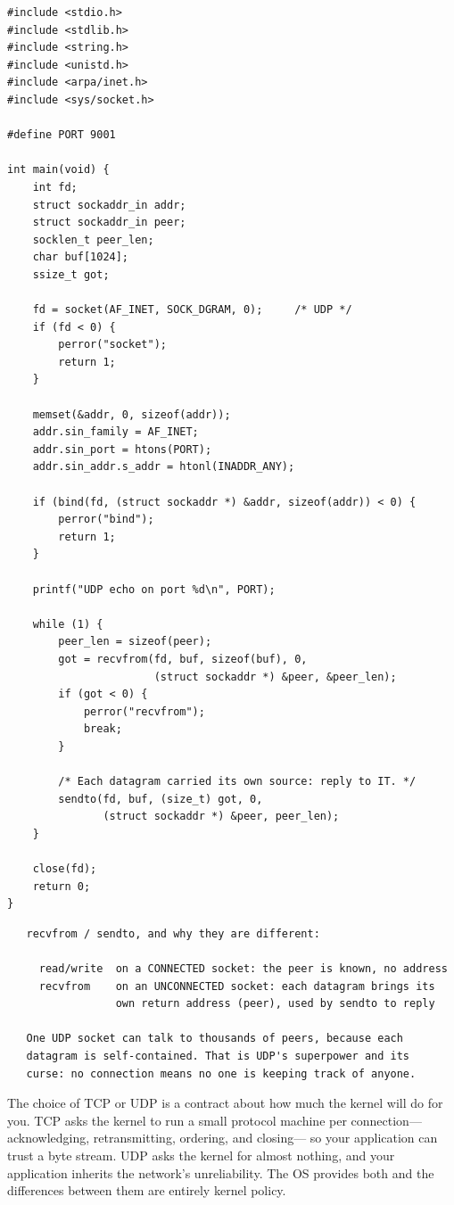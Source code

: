 \begin{lstlisting}[caption={udp\_echo.c: a datagram echo server.}]
#include <stdio.h>
#include <stdlib.h>
#include <string.h>
#include <unistd.h>
#include <arpa/inet.h>
#include <sys/socket.h>

#define PORT 9001

int main(void) {
    int fd;
    struct sockaddr_in addr;
    struct sockaddr_in peer;
    socklen_t peer_len;
    char buf[1024];
    ssize_t got;

    fd = socket(AF_INET, SOCK_DGRAM, 0);     /* UDP */
    if (fd < 0) {
        perror("socket");
        return 1;
    }

    memset(&addr, 0, sizeof(addr));
    addr.sin_family = AF_INET;
    addr.sin_port = htons(PORT);
    addr.sin_addr.s_addr = htonl(INADDR_ANY);

    if (bind(fd, (struct sockaddr *) &addr, sizeof(addr)) < 0) {
        perror("bind");
        return 1;
    }

    printf("UDP echo on port %d\n", PORT);

    while (1) {
        peer_len = sizeof(peer);
        got = recvfrom(fd, buf, sizeof(buf), 0,
                       (struct sockaddr *) &peer, &peer_len);
        if (got < 0) {
            perror("recvfrom");
            break;
        }

        /* Each datagram carried its own source: reply to IT. */
        sendto(fd, buf, (size_t) got, 0,
               (struct sockaddr *) &peer, peer_len);
    }

    close(fd);
    return 0;
}
\end{lstlisting}

\begin{verbatim}
   recvfrom / sendto, and why they are different:

     read/write  on a CONNECTED socket: the peer is known, no address
     recvfrom    on an UNCONNECTED socket: each datagram brings its
                 own return address (peer), used by sendto to reply

   One UDP socket can talk to thousands of peers, because each
   datagram is self-contained. That is UDP's superpower and its
   curse: no connection means no one is keeping track of anyone.
\end{verbatim}

\begin{osconcept}
The choice of TCP or UDP is a contract about how much the kernel will
do for you. TCP asks the kernel to run a small protocol machine per
connection---acknowledging, retransmitting, ordering, and closing---
so your application can trust a byte stream. UDP asks the kernel for
almost nothing, and your application inherits the network's
unreliability. The OS provides both and the differences between them
are entirely kernel policy.
\end{osconcept}

